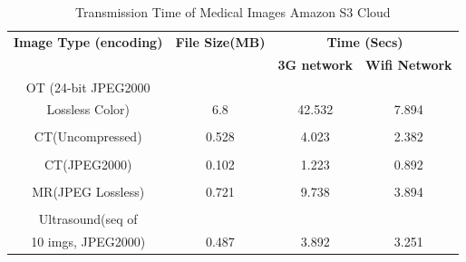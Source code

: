 \documentclass{article}
\begin{document}
\begin{table}[H]
\centering %

\caption{\label{tab1}Transmission Time of Medical Images Amazon S3 Cloud}
\begin{tabular}{cccc}
\hline\hline
\textbf{Image Type (encoding)}  & \textbf{File Size(MB)} & \multicolumn{2}{c}{\textbf{Time (Secs)}}  \\
\textbf{} & \textbf{} & \textbf{3G network} & \textbf{Wifi Network}\\\hline
OT (24-bit JPEG2000\\ 
Lossless Color) & 6.8 & 42.532 & 7.894\\\\
CT(Uncompressed) & 0.528 & 4.023 & 2.382\\\\
CT(JPEG2000) & 0.102 & 1.223 & 0.892\\\\
MR(JPEG Lossless) & 0.721 & 9.738 & 3.894\\\\
Ultrasound(seq of\\10 imgs, JPEG2000) & 0.487 & 3.892 & 3.251\\
\hline\hline
\end{tabular}
\end{table}

\hfill
\end{document}
